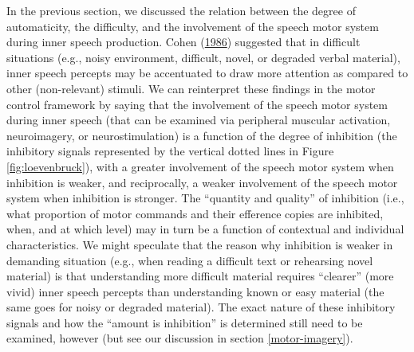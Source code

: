 \documentclass[a4paper,12pt,twoside,onecolumn,openright,final,oldfontcommands]{memoir}
\begin{document}
In the previous section, we discussed the relation between the degree of automaticity, the difficulty, and the involvement of the speech motor system during inner speech production. Cohen (\protect\hyperlink{ref-cohen_motor_1986}{1986}) suggested that in difficult situations (e.g., noisy environment, difficult, novel, or degraded verbal material), inner speech percepts may be accentuated to draw more attention as compared to other (non-relevant) stimuli. We can reinterpret these findings in the motor control framework by saying that the involvement of the speech motor system during inner speech (that can be examined via peripheral muscular activation, neuroimagery, or neurostimulation) is a function of the degree of inhibition (the inhibitory signals represented by the vertical dotted lines in Figure \ref{fig:loevenbruck}), with a greater involvement of the speech motor system when inhibition is weaker, and reciprocally, a weaker involvement of the speech motor system when inhibition is stronger. The \enquote{quantity and quality} of inhibition (i.e., what proportion of motor commands and their efference copies are inhibited, when, and at which level) may in turn be a function of contextual and individual characteristics. We might speculate that the reason why inhibition is weaker in demanding situation (e.g., when reading a difficult text or rehearsing novel material) is that understanding more difficult material requires \enquote{clearer} (more vivid) inner speech percepts than understanding known or easy material (the same goes for noisy or degraded material). The exact nature of these inhibitory signals and how the \enquote{amount is inhibition} is determined still need to be examined, however (but see our discussion in section \ref{motor-imagery}).
\end{document}
